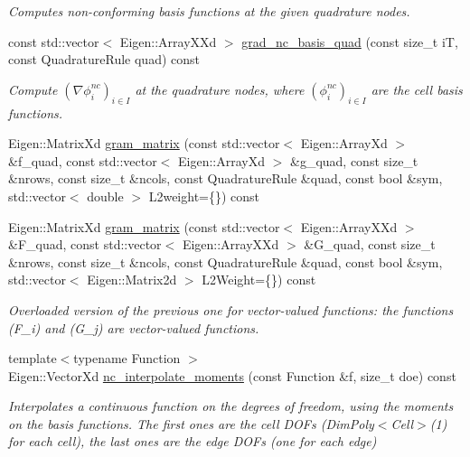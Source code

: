 \begin{DoxyCompactItemize}
\begin{DoxyCompactList}\small\item\em Computes non-\/conforming basis functions at the given quadrature nodes. \end{DoxyCompactList}\item 
const std\+::vector$<$ Eigen\+::\+Array\+X\+Xd $>$ \hyperlink{group__BPNC_gab7cc52dd5f725b057ec52cca573bf15f}{grad\+\_\+nc\+\_\+basis\+\_\+quad} (const size\+\_\+t iT, const Quadrature\+Rule quad) const
\begin{DoxyCompactList}\small\item\em Compute $(\nabla \phi_i^{nc})_{i\in I}$ at the quadrature nodes, where $(\phi_i^{nc})_{i\in I}$ are the cell basis functions. \end{DoxyCompactList}\item 
Eigen\+::\+Matrix\+Xd \hyperlink{group__BPNC_gaa3150fe82adc0be190b698e1b17f6bc8}{gram\+\_\+matrix} (const std\+::vector$<$ Eigen\+::\+Array\+Xd $>$ \&f\+\_\+quad, const std\+::vector$<$ Eigen\+::\+Array\+Xd $>$ \&g\+\_\+quad, const size\+\_\+t \&nrows, const size\+\_\+t \&ncols, const Quadrature\+Rule \&quad, const bool \&sym, std\+::vector$<$ double $>$ L2weight=\{\}) const
\item 
Eigen\+::\+Matrix\+Xd \hyperlink{group__BPNC_gaf92e85c265e2138324347e02c2b7847f}{gram\+\_\+matrix} (const std\+::vector$<$ Eigen\+::\+Array\+X\+Xd $>$ \&F\+\_\+quad, const std\+::vector$<$ Eigen\+::\+Array\+X\+Xd $>$ \&G\+\_\+quad, const size\+\_\+t \&nrows, const size\+\_\+t \&ncols, const Quadrature\+Rule \&quad, const bool \&sym, std\+::vector$<$ Eigen\+::\+Matrix2d $>$ L2\+Weight=\{\}) const
\begin{DoxyCompactList}\small\item\em Overloaded version of the previous one for vector-\/valued functions\+: the functions (F\+\_\+i) and (G\+\_\+j) are vector-\/valued functions. \end{DoxyCompactList}\item 
{\footnotesize template$<$typename Function $>$ }\\Eigen\+::\+Vector\+Xd \hyperlink{group__BPNC_ga25153a400e70dd231c4c29f0f72f9f4d}{nc\+\_\+interpolate\+\_\+moments} (const Function \&f, size\+\_\+t doe) const
\begin{DoxyCompactList}\small\item\em Interpolates a continuous function on the degrees of freedom, using the moments on the basis functions. The first ones are the cell D\+O\+Fs (Dim\+Poly$<$\+Cell$>$(1) for each cell), the last ones are the edge D\+O\+Fs (one for each edge) \end{DoxyCompactList}\item 

\end{DoxyCompactItemize}
